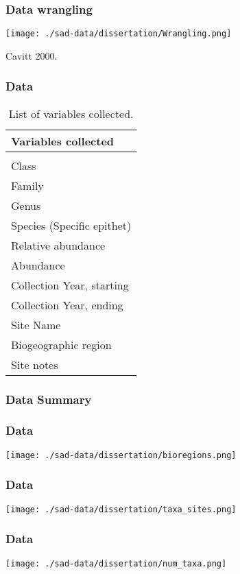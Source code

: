 \documentclass[14pt]{beamer}
\begin{document}
\begin{frame}[t]
\frametitle{Data wrangling}
\begin{center}
\texttt{[image: ./sad-data/dissertation/Wrangling.png]}
\end{center}
\begin{tiny}
Cavitt 2000.
\end{tiny}
\end{frame}

\begin{frame}[shrink=30]
\frametitle{Data}
\begin{table}
\begin{tabular}{l} 
 Variables collected\\ 
\hline
\\
 Class \\
 Family\\
 Genus \\
 Species (Specific epithet)\\
 Relative abundance \\
 Abundance \\
 Collection Year, starting\\
 Collection Year, ending \\
 Site Name \\
 Biogeographic region \\
 Site notes\\ 
\end{tabular}
\caption{List of variables collected.}
\end{table}
\end{frame}

\subsubsection{Data Summary}
\begin{frame}{}
\frametitle{Data}
\texttt{[image: ./sad-data/dissertation/bioregions.png]}
\end{frame}

\begin{frame}{}
\frametitle{Data}
\texttt{[image: ./sad-data/dissertation/taxa\_sites.png]}
\end{frame}

\begin{frame}{}
\frametitle{Data}
\texttt{[image: ./sad-data/dissertation/num\_taxa.png]}
\end{frame}
\end{document}
